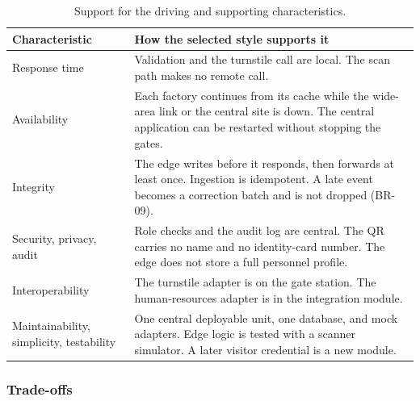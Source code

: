 \begin{table}[ht]
\centering
\caption{Support for the driving and supporting characteristics.}
\label{tab:support}
\small
\begin{tabularx}{\textwidth}{@{}lX@{}}
\toprule
\textbf{Characteristic} & \textbf{How the selected style supports it}\\
\midrule
Response time &
Validation and the turnstile call are local.
The scan path makes no remote call.\\
\addlinespace
Availability &
Each factory continues from its cache while the wide-area link or the central site is down.
The central application can be restarted without stopping the gates.\\
\addlinespace
Integrity &
The edge writes before it responds, then forwards at least once.
Ingestion is idempotent.
A late event becomes a correction batch and is not dropped (BR-09).\\
\addlinespace
Security, privacy, audit &
Role checks and the audit log are central.
The QR carries no name and no identity-card number.
The edge does not store a full personnel profile.\\
\addlinespace
Interoperability &
The turnstile adapter is on the gate station.
The human-resources adapter is in the integration module.\\
\addlinespace
Maintainability, simplicity, testability &
One central deployable unit, one database, and mock adapters.
Edge logic is tested with a scanner simulator.
A later visitor credential is a new module.\\
\bottomrule
\end{tabularx}
\end{table}

\subsubsection{Trade-offs}

